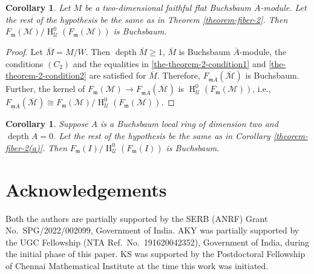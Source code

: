 \documentclass[11pt,reqno]{amsart}
\newtheorem{corollary}[theorem]{Corollary}
\theoremstyle{definition}
\newcommand{\m}{\mathfrak m}
\def\U{{\mathcal U}}
\def\M{{\mathcal M}}
\DeclareMathOperator{\h}{H}
\DeclareMathOperator{\depth}{depth}
\numberwithin{equation}{section}
\begin{document}
\begin{corollary}Let $M$ be a two-dimensional faithful flat Buchsbaum $A$-module. Let the rest of the hypothesis be the same as in 
	 Theorem \ref{theorem-fiber-2}. Then 
	$F_{\m}(\M)/ \h^0_\U(F_\m (\M))$ is Buchsbaum.
	\end{corollary}
	 \begin{proof}
	 	 Let $\overline{M}=M/W$. Then $\depth \overline{M}\geq 1$, $\overline{M}$ is Buchsbaum $\overline{A}$-module,
	 	the conditions  $(C_2)$ and the equalities in \eqref{the-theorem-2-condition1} and \eqref{the-theorem-2-condition2} are satisfied for $\overline{M}$. Therefore, $F_{\m \overline{A}}(\overline{\M})$ is Buchsbaum. Further, the kernel of $F_{\m}(\M)\to F_{\m \overline{A}}(\overline{\M})$ is $\h^0_\U(F_\m (\M))$, i.e., $F_{\m \overline{A}}(\overline{\M})\cong F_{\m}(\M)/ \h^0_\U(F_\m (\M)).$ 
	 \end{proof}
     \begin{corollary}\label{corollay_8.12}
         Suppose $A$ is a Buchsbaum local ring of dimension two and $\depth A=0$.
	Let the rest of the hypothesis be the same as in 
	Corollary \ref{theorem-fiber-2(a)}. Then 
	$F_{\m}(I)/ \h^0_\U(F_\m (I))$ is Buchsbaum.
     \end{corollary}
\section*{Acknowledgements}

Both the authors are partially supported by the SERB (ANRF) Grant No.~SPG/2022/002099, Government of India. 
AKY was partially supported by the UGC Fellowship (NTA Ref.\ No.~191620042352), Government of India, during the initial phase of this paper. 
KS was supported by the Postdoctoral Fellowship of Chennai Mathematical Institute at the time this work was initiated.
     
\end{document}
